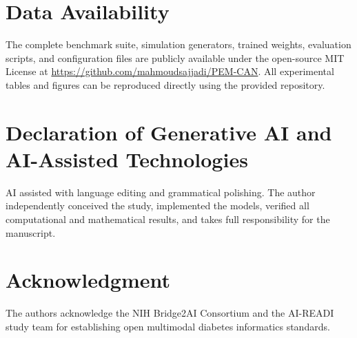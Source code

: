 \documentclass[journal,10pt,twocolumn]{IEEEtran}
\begin{document}
\section*{Data Availability}
The complete benchmark suite, simulation generators, trained weights, evaluation scripts, and configuration files are publicly available under the open-source MIT License at \url{https://github.com/mahmoudsajjadi/PEM-CAN}. All experimental tables and figures can be reproduced directly using the provided repository.

\section*{Declaration of Generative AI and AI-Assisted Technologies}
AI assisted with language editing and grammatical polishing. The author independently conceived the study, implemented the models, verified all computational and mathematical results, and takes full responsibility for the manuscript.

\section*{Acknowledgment}
The authors acknowledge the NIH Bridge2AI Consortium and the AI-READI study team for establishing open multimodal diabetes informatics standards.
\end{document}
